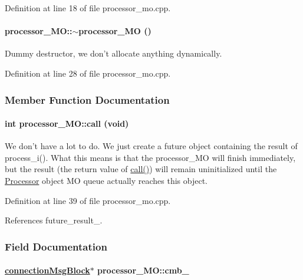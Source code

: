 Definition at line 18 of file processor\_\-mo.cpp.\hypertarget{classprocessor__MO_processor__MOa1}{
\paragraph[$\sim$processor\_\-MO]{\setlength{\rightskip}{0pt plus 5cm}processor\_\-MO::$\sim$processor\_\-MO ()}\hfill}
\label{classprocessor__MO_processor__MOa1}


Dummy destructor, we don't allocate anything dynamically. 

Definition at line 28 of file processor\_\-mo.cpp.

\subsubsection{Member Function Documentation}
\hypertarget{classprocessor__MO_processor__MOa2}{
\paragraph[call]{\setlength{\rightskip}{0pt plus 5cm}int processor\_\-MO::call (void)}\hfill}
\label{classprocessor__MO_processor__MOa2}


We don't have a lot to do. We just create a future object containing the result of process\_\-i(). What this means is that the processor\_\-MO will finish immediately, but the result (the return value of \hyperlink{classprocessor__MO_processor__MOa2}{call()}) will remain uninitialized until the \hyperlink{classProcessor}{Processor} object MO queue actually reaches this object. 

Definition at line 39 of file processor\_\-mo.cpp.

References future\_\-result\_\-.

\subsubsection{Field Documentation}
\hypertarget{classprocessor__MO_processor__MOo1}{
\paragraph[cmb\_\-]{\setlength{\rightskip}{0pt plus 5cm}\hyperlink{classconnectionMsgBlock}{connection\-Msg\-Block}$\ast$ processor\_\-MO::cmb\_\-}\hfill}
\label{classprocessor__MO_processor__MOo1}





